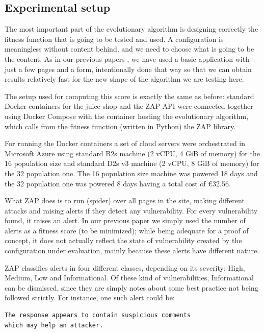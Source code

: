 \documentclass[sigconf]{acmart}
\begin{document}
\subsection{Experimental setup}
\label{subs:setup}

The most important part of the evolutionary algorithm is designing
correctly the fitness function that is going to be tested and used.
A configuration is meaningless without
content behind, and we need to choose what is going to be the
content. As in our previous papers
\cite{erseco:evostar:anon,erseco:cec}, we have used a basic
application with just a few pages and a form, intentionally done that
way so that we can obtain results relatively fast for the new shape of
the algorithm we are testing here.

The setup used for computing this score is exactly the same as before:
standard Docker containers for the juice shop and the ZAP
API were connected together using Docker Compose  with the container
hosting the evolutionary algorithm, which calls from the fitness
function (written in Python) the ZAP library.

For running the Docker containers a set of cloud servers were
orchestrated in Microsoft Azure using standard B2s machine (2 vCPU,
4 GiB of memory) for the 16 population size and standard D2s v3 machine
(2 vCPU, 8 GiB of memory) for the 32 population one. The 16 population
size machine was powered 18 days and the 32 population one was powered
8 days having a total cost of €32.56.

What ZAP does is to run (spider)
over all pages in the site, making different attacks and raising
alerts if they detect any vulnerability. For every vulnerability
found, it raises an alert. In our previous paper we simply used the
number of alerts as a fitness score (to be minimized); while being
adequate for a proof of concept, it does not actually reflect the
state of vulnerability created by the configuration under evaluation,
mainly because these alerts have different nature.

ZAP classifies alerts in four different classes, depending on its
severity: High, Medium, Low and Informational. Of these kind of
vulnerabilities, Informational can be dismissed, since they are simply
notes about some best practice not being followed strictly. For
instance, one such alert could be:

\begin{verbatim}
The response appears to contain suspicious comments
which may help an attacker.
\end{verbatim}
\end{document}
